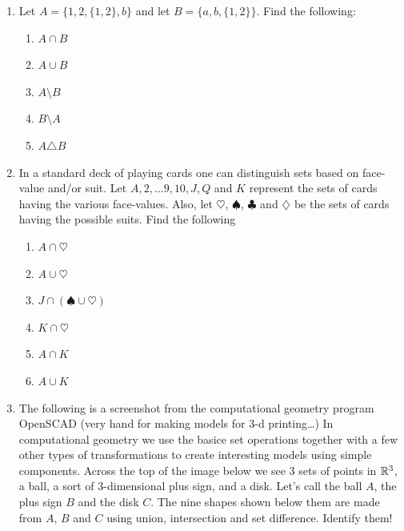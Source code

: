 \begin{enumerate}
\item Let $A = \{1, 2, \{1, 2\}, b\}$ and let $B=\{a, b, \{1, 2\} \}$.
Find the following:
  \begin{enumerate}
  \item \wbitemsep $A \cap B$   
  \item \wbitemsep $A \cup B$ 
  \item \wbitemsep $A \setminus B$ 
  \item \wbitemsep $B \setminus A$ 
  \item \wbitemsep $A \triangle B$ 
  \end{enumerate}

\vfill


\workbookpagebreak

\item In a standard deck of playing cards one can distinguish sets
based on face-value and/or suit.  Let $A, 2, \ldots 9, 10, J, Q$ and $K$
represent the sets of cards having the various face-values.  Also, let
$\heartsuit$, $\spadesuit$, $\clubsuit$ and $\diamondsuit$ be the 
sets of cards having the possible suits.  Find the following
  \begin{enumerate}
  \item \wbitemsep$A \cap \heartsuit$ 
  \item \wbitemsep$A \cup \heartsuit$ 
  \item \wbitemsep$J \cap (\spadesuit \cup \heartsuit)$ 
  \item \wbitemsep$K \cap \heartsuit$ 
  \item \wbitemsep$A \cap K$ \hint{$\emptyset$ }
  \item \wbitemsep$A \cup K$ 
  \end{enumerate}

\vfill


\pagebreak

\item The following is a screenshot from the computational geometry program OpenSCAD (very hand for making models for 3-d printing\ldots)  In computational geometry we use the basice set operations together
with a few other types of transformations to create interesting models using simple components.  Across the top of the image below we see 3 sets of points in ${\mathbb R}^3$, a ball, a sort of 3-dimensional plus sign, and a disk.  Let's call the ball $A$, the plus sign $B$ and the disk $C$.   The nine shapes shown below them are made from $A$, $B$ and $C$ using union, intersection and set difference.  Identify them!


\end{enumerate}

